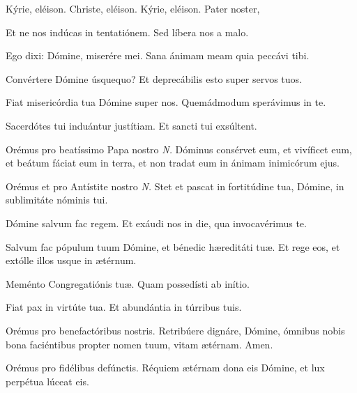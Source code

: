 
\label{preces}Kýrie, eléison. Christe, eléison. Kýrie, eléison. Pater noster, 


\vv Et ne nos indúcas in tentatiónem. \rr Sed líbera nos a malo.

\vv Ego dixi: Dómine, miserére mei. \rr Sana ánimam meam quia peccávi tibi.

\vv Convértere Dómine úsquequo?
\rr Et deprecábilis esto super servos tuos.

\vv Fiat misericórdia tua Dómine super nos.
\rr Quemádmodum sperávimus in te.

\vv Sacerdótes tui induántur justítiam.
\rr Et sancti tui exsúltent.

\vv Orémus pro beatíssimo Papa nostro \textit{N.}
\rr Dóminus consérvet eum, et vivíficet eum, et beátum fáciat eum in terra, et non tradat eum in ánimam inimicórum ejus.

\vv Orémus et pro Antístite nostro \textit{N.}
\rr Stet et pascat in fortitúdine tua, Dómine, in sublimitáte nóminis tui.


\vv Dómine salvum fac regem.
\rr Et exáudi nos in die, qua invocavérimus te.

\vv Salvum fac pópulum tuum Dómine, et bénedic hæreditáti tuæ.
\rr Et rege eos, et extólle illos usque in ætérnum.

\vv Meménto Congregatiónis tuæ.
\rr Quam possedísti ab inítio.

\vv Fiat pax in virtúte tua.
\rr Et abundántia in túrribus tuis.

\vv Orémus pro benefactóribus nostris.
\rr Retribúere dignáre, Dómine, ómnibus nobis bona faciéntibus propter nomen tuum, vitam ætérnam. Amen.

\vv Orémus pro fidélibus defún\-ctis.
\rr Réquiem ætérnam dona eis Dómine, et lux perpétua lúceat eis.

